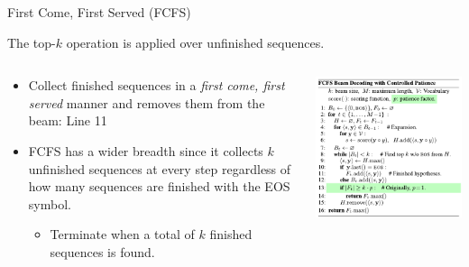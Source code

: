\documentclass[t, unicode, 12pt, xdvipdfmx, aspectratio=169, bxjsarticle]{beamer}
\begin{document}
\begin{frame}[label={sec:orgeeb1715}]{First Come, First Served (FCFS)}
\vspace{-0.2cm}
\begin{block}{The top-$k$ operation is applied over unfinished sequences.}
\begin{columns}
\begin{column}{0.5\columnwidth}
\begin{itemize}
\item Collect finished sequences in a \textit{first come, first served} manner and removes them from the beam: Line 11
\item FCFS has a wider breadth since it collects \(k\) unfinished sequences at every step regardless of how many sequences are finished with the EOS symbol.
\begin{itemize}
\item Terminate when a total of \(k\) finished sequences is found.
\end{itemize}
\end{itemize}
\end{column}

\begin{column}{0.5\columnwidth}
\vspace{-0.3cm}
\begin{center}
\includegraphics[width=0.95\linewidth]{./figure/FCFS.pdf}
\end{center}
\end{column}
\end{columns}
\end{block}
\end{frame}
\end{document}
